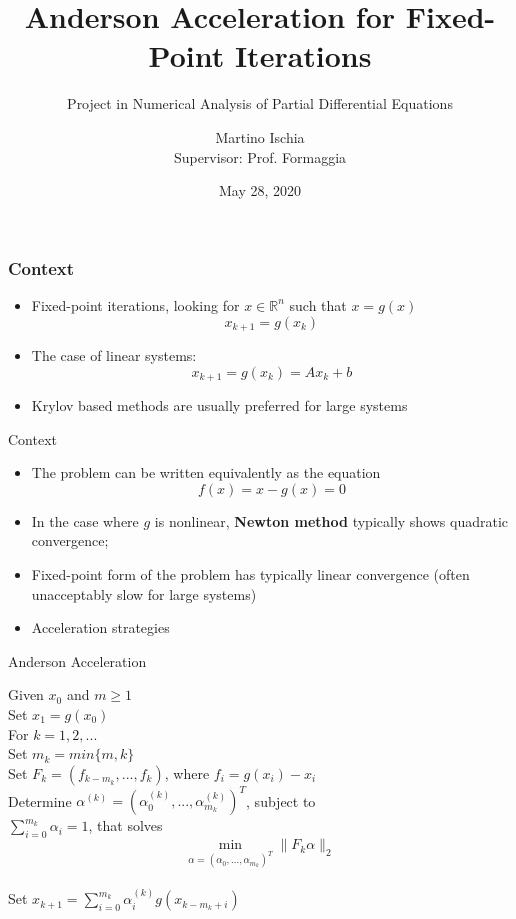 \documentclass{beamer}
\title[Anderson Acceleration]{Anderson Acceleration for Fixed-Point Iterations}
\subtitle {Project in Numerical Analysis of Partial Differential Equations}
\author[Martino Ischia]{Martino Ischia\\ \footnotesize{Supervisor: Prof. Formaggia}}
\institute[]
		{
		Politecnico di Milano
		}
\date{May 28, 2020}
\begin{document}
			
			\begin{frame}
				\titlepage 
			\end{frame}
				
				\begin{frame}
					\frametitle{Context}
					\begin{itemize}
						\item Fixed-point iterations, looking for $x\in\mathbb{R}^n$ such that $x=g(x)$
						$$x_{k+1} = g(x_k)$$
						\item The case of linear systems:
						$$x_{k+1} = g(x_k) = A x_k + b$$
						\item Krylov based methods are usually preferred for large   systems
					\end{itemize}
				\end{frame}
				
				
				\begin{frame}{Context}
					
					\begin{itemize}
						\item The problem can be written equivalently as the equation
						$$ f(x) = x - g(x) = 0 $$
						\item In the case where $g$ is nonlinear, \textbf{Newton method} typically shows quadratic convergence;
						\item Fixed-point form of the problem has typically linear convergence (often unacceptably slow for large systems)
						\item  Acceleration strategies
					\end{itemize}    
				\end{frame}
				
				
				\begin{frame}{Anderson Acceleration \hypersetup{linkcolor=white}\cite{p5}\hypersetup{linkcolor=blue}}
					
					Given $x_0$ and $m \geq 1$\\
					Set $x_1 = g(x_0)$\\
					For $k = 1, 2, ...$\\
					\hspace*{16pt} Set $m_k = min\{m, k\}$\\
					\hspace*{20pt}Set $F_k = (f_{k-m_k}, ... , f_k)$, where $f_i = g(x_i)-x_{i}$\\
					\hspace*{20pt}Determine $\alpha^{(k)} = (\alpha^{(k)}
					_0 , ..., \alpha^{(k)}_{m_k} )^T$, subject to\\ \hspace*{20pt}$\sum^{m_k}_{i=0} {\alpha_i = 1}$, that solves
					$$\min_{\alpha=(\alpha_0,...,\alpha_{m_k} )^T} \|F_k \alpha\|_2$$\\
					\hspace*{20pt}Set $x_{k+1} =\sum^{m_k}
					_{i=0} {\alpha_i^{(k)} g(x_{k-m_{k}+i})}$    
				\end{frame}
				
\end{document}
